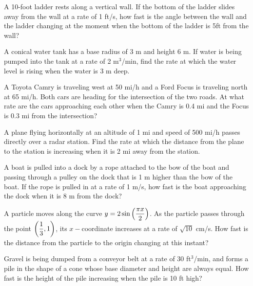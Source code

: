 \documentclass[notes]{subfiles}
\begin{document}
		\begin{ex}
			A 10-foot ladder rests along a vertical wall.  If the bottom of the ladder slides away from the wall at a rate of 1 ft/s, how fast is the angle between the wall and the ladder changing at the moment when the bottom of the ladder is 5ft from the wall?
		\end{ex}
			\newpage
			
		\begin{ex}
			A conical water tank has a base radius of 3 m and height 6 m.  If water is being pumped into the tank at a rate of 2 m$^3$/min, find the rate at which the water level is rising when the water is 3 m deep.
		\end{ex}
			
		\begin{ex}
			A Toyota Camry is traveling west at 50 mi/h and a Ford Focus is traveling north at 65 mi/h.  Both cars are heading for the intersection of the two roads.  At what rate are the cars approaching each other when the Camry is 0.4 mi and the Focus is 0.3 mi from the intersection?
		\end{ex}
			\newpage
			
		\begin{ex}
			A plane flying horizontally at an altitude of 1 mi and speed of 500 mi/h passes directly over a radar station.  Find the rate at which the distance from the plane to the station is increasing when it is 2 mi away from the station.
		\end{ex}
			
		\begin{ex}
			A boat is pulled into a dock by a rope attached to the bow of the boat and passing through a pulley on the dock that is 1 m higher than the bow of the boat.  If the rope is pulled in at a rate of 1 m/s, how fast is the boat approaching the dock when it is 8 m from the dock?
		\end{ex}
			\newpage
			
		\begin{ex}
			A particle moves along the curve $y = 2\sin\left( \dfrac{\pi x}{2}\right)$.  As the particle passes through the point $\left( \dfrac{1}{3},1\right)$, its $x-$coordinate increases at a rate of $\sqrt{10}$ cm/s.  How fast is the distance from the particle to the origin changing at this instant?
		\end{ex}
			
		\begin{ex}
			Gravel is being dumped from a conveyor belt at a rate of 30 ft$^3$/min, and forms a pile in the shape of a cone whose base diameter and height are always equal.  How fast is the height of the pile increasing when the pile is 10 ft high?
		\end{ex}
			\newpage
	
\end{document}
